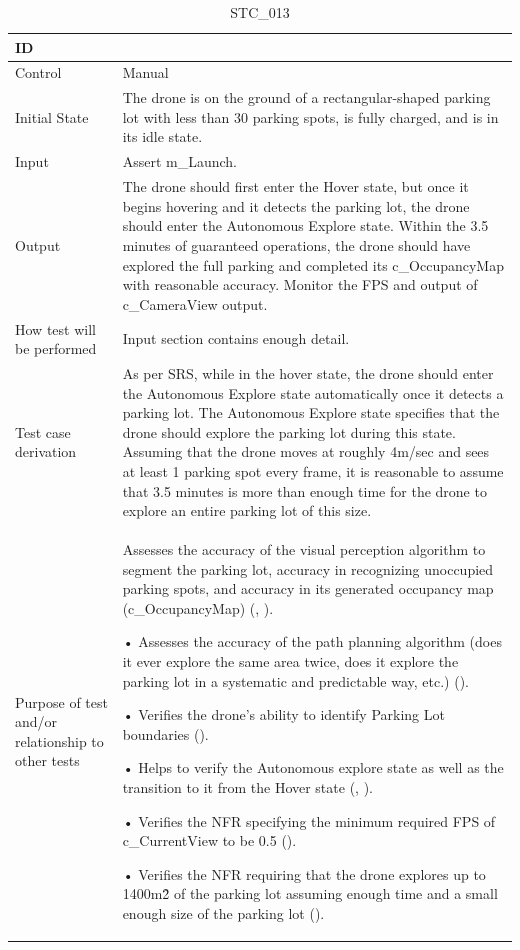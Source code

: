 \documentclass[12pt, titlepage]{article}
\begin{document}
\begin{table}[!h]
\begin{center}
\caption {STC\_013}
\label{tab:STC_013}
\begin{tabular}{ | m{1.5cm} | m{15cm} | } 
\hline
ID & \nameref{tab:STC_013} \\ 
\hline
Control & Manual \\ 
\hline
Initial State & The drone is on the ground of a rectangular-shaped parking lot with less than 30 parking spots, is fully charged, and is in its idle state.  \\ 
\hline
Input & Assert m\_Launch. \\ 
\hline
Output & The drone should first enter the Hover state, but once it begins hovering and it detects the parking lot, the drone should enter the Autonomous Explore state. Within the 3.5 minutes of guaranteed operations, the drone should have explored the full parking and completed its c\_OccupancyMap with reasonable accuracy. 
Monitor the FPS and output of c\_CameraView output. \\ 
\hline
How test will be performed & Input section contains enough detail. \\ 
\hline
Test case derivation & As per SRS, while in the hover state, the drone should enter the Autonomous Explore state automatically once it detects a parking lot. The Autonomous Explore state specifies that the drone should explore the parking lot during this state. Assuming that the drone moves at roughly 4m/sec and sees at least 1 parking spot every frame, it is reasonable to assume that 3.5 minutes is more than enough time for the drone to explore an entire parking lot of this size.
 \\ 
\hline
Purpose of test and/or relationship to other tests & 
\item Assesses the accuracy of the visual perception algorithm to segment the parking lot, accuracy in recognizing unoccupied parking spots, and accuracy in its generated occupancy map (c\_OccupancyMap) (\nameref{GEN_005}, \nameref{GEN_006}).

• Assesses the accuracy of the path planning algorithm (does it ever explore the same area twice, does it explore the parking lot in a systematic and predictable way, etc.) (\nameref{STA_003}).

• Verifies the drone’s ability to identify Parking Lot boundaries (\nameref{GEN_001}).

• Helps to verify the Autonomous explore state as well as the transition to it from the Hover state (\nameref{STA_003}, \nameref{TRANS_004}).

• Verifies the NFR specifying the minimum required FPS of c\_CurrentView to be 0.5 (\nameref{PERF_004}).

• Verifies the NFR requiring that the drone explores up to 1400m\^2 of the parking lot assuming enough time and a small enough size of the parking lot (\nameref{PERF_001}).
\\ 
\hline
\end{tabular}
\end{center}
\end{table}
\end{document}
